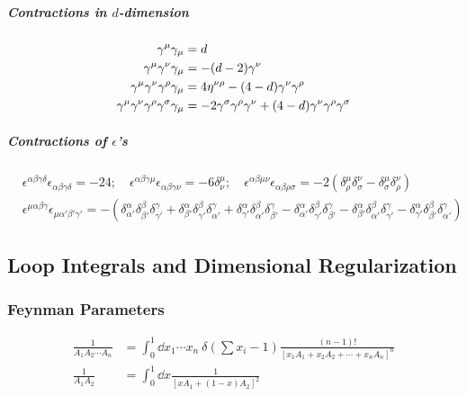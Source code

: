 \subparagraph{Contractions in $d$-dimension}
\begin{align}
 \gamma^{\mu}\gamma_{\mu}&=d\\
 \gamma^{\mu}\gamma^{\nu}\gamma_{\mu}&=-(d-2)\gamma^{\nu}\\
 \gamma^{\mu}\gamma^{\nu}\gamma^{\rho}\gamma_{\mu}&=4\eta^{\nu\rho}-(4-d)\gamma^{\nu}\gamma^{\rho}\\
 \gamma^{\mu}\gamma^{\nu}\gamma^{\rho}\gamma^{\sigma}\gamma_{\mu}&=-2\gamma^{\sigma}\gamma^{\rho}\gamma^{\nu} + (4-d)\gamma^{\nu}\gamma^{\rho}\gamma^{\sigma}
\end{align}


\subparagraph{Contractions of $\epsilon$'s}
\begin{align}
& \epsilon^{\alpha\beta\gamma\delta}\epsilon_{\alpha\beta\gamma\delta}=-24;\quad
 \epsilon^{\alpha\beta\gamma\mu}\epsilon_{\alpha\beta\gamma\nu}=-6\delta^\mu_\nu;\quad
 \epsilon^{\alpha\beta\mu\nu}\epsilon_{\alpha\beta\rho\sigma}=-2(
\delta^\mu_\rho\delta^\nu_\sigma-\delta^\mu_\sigma\delta^\nu_\rho
)\\
&\epsilon^{\mu\alpha\beta\gamma}\epsilon_{\mu\alpha'\beta'\gamma'}=-
\left
(\delta^\alpha_{\alpha'}\delta^\beta_{\beta'}\delta^\gamma_{\gamma'}
+\delta^\alpha_{\beta'}\delta^\beta_{\gamma'}\delta^\gamma_{\alpha'}
+\delta^\alpha_{\gamma'}\delta^\beta_{\alpha'}\delta^\gamma_{\beta'}
-\delta^\alpha_{\alpha'}\delta^\beta_{\gamma'}\delta^\gamma_{\beta'}
-\delta^\alpha_{\beta'}\delta^\beta_{\alpha'}\delta^\gamma_{\gamma'}
-\delta^\alpha_{\gamma'}\delta^\beta_{\beta'}\delta^\gamma_{\alpha'}
\right)
\end{align}


\newpage

\subsection{Loop Integrals and Dimensional Regularization}
\subsubsection{Feynman Parameters}\vspace{-2.5zw}
\begin{align}
 \frac{1}{A_1A_2\cdots A_n}&=
\int_0^1\dd x_1\cdots x_n\ \delta\left(\sum x_i-1\right)
\frac{(n-1)!}{[x_1A_1+x_2A_2+\cdots+x_nA_n]^n}\\
 \frac{1}{A_1A_2}&=
\int_0^1\dd x\frac{1}{[xA_1+(1-x)A_2]^2}
\end{align}

